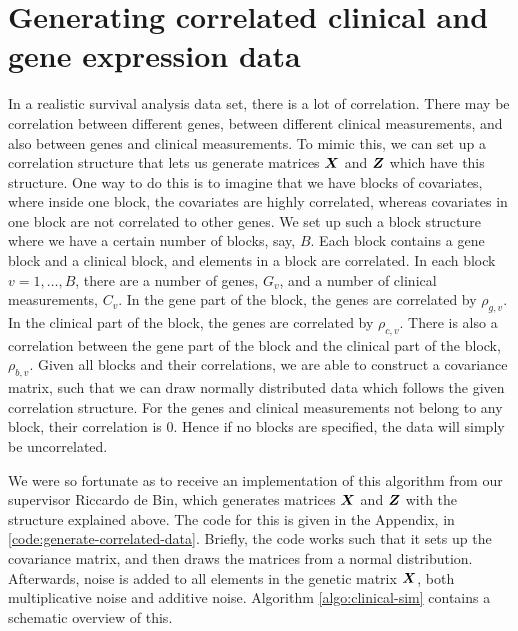 \section{Generating correlated clinical and gene expression data}
\label{sec:generating-correlated-data}
In a realistic survival analysis data set, there is a lot of correlation.
There may be correlation between different genes, between different clinical measurements, and also between genes and clinical measurements.
To mimic this, we can set up a correlation structure that lets us generate matrices $\bm{X}$ and $\bm{Z}$ which have this structure.
One way to do this is to imagine that we have blocks of covariates, where inside one block, the covariates are highly correlated, whereas covariates in one block are not correlated to other genes.
We set up such a block structure where we have a certain number of blocks, say, $B$.
Each block contains a gene block and a clinical block, and elements in a block are correlated.
In each block $v=1,\ldots,B$, there are a number of genes, $G_v$, and a number of clinical measurements, $C_v$.
In the gene part of the block, the genes are correlated by $\rho_{g,v}$.
In the clinical part of the block, the genes are correlated by $\rho_{c,v}$.
There is also a correlation between the gene part of the block and the clinical part of the block, $\rho_{b,v}$.
Given all blocks and their correlations, we are able to construct a covariance matrix, such that we can draw normally distributed data which follows the given correlation structure.
For the genes and clinical measurements not belong to any block, their correlation is 0.
Hence if no blocks are specified, the data will simply be uncorrelated.

We were so fortunate as to receive an implementation of this algorithm from our supervisor Riccardo de Bin, which generates matrices $\bm{X}$ and $\bm{Z}$ with the structure explained above.
The code for this is given in the Appendix, in \ref{code:generate-correlated-data}.
Briefly, the code works such that it sets up the covariance matrix, and then draws the matrices from a normal distribution.
Afterwards, noise is added to all elements in the genetic matrix $\bm{X}$, both multiplicative noise and additive noise.
Algorithm \ref{algo:clinical-sim} contains a schematic overview of this.

